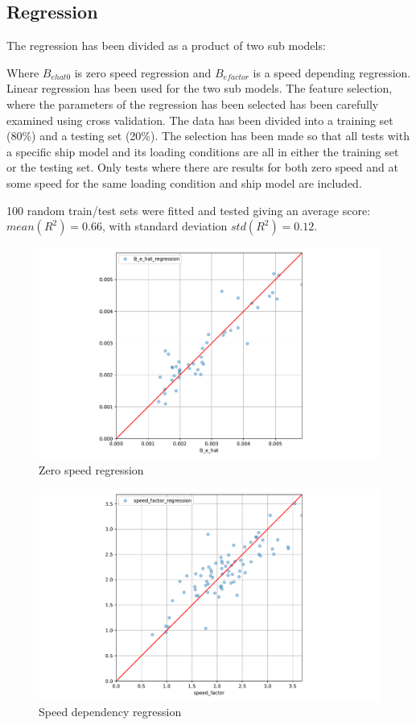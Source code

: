 \subsection{Regression}
The regression has been divided as a product of two sub models:

Where $B_{ehat0}$ is zero speed regression and $B_{efactor}$ is a speed depending regression. Linear regression has been used for the two sub models. The feature selection, where the parameters of the regression has been selected has been carefully examined using cross validation. The data has been divided into a  training set (80\%) and a testing set (20\%). The selection has been made so that all tests with a specific ship model and its loading conditions are all in either the training set or the testing set. Only tests where there are results for both zero speed and at some speed for the same loading condition and ship model are included.    

100 random train/test sets were fitted and tested giving an average score: $mean(R^2)=0.66$, with standard deviation $std(R^2)=0.12$.

\begin{figure}[H]
    \centering
    \includegraphics[width=\columnwidth]{figures/B_e_hat0_regression.pdf}
    \caption{Zero speed regression}
    \label{fig:B_e_hat0_regression}
\end{figure}

\begin{figure}[H]
    \centering
    \includegraphics[width=\columnwidth]{figures/B_e_factor_regression.pdf}
    \caption{Speed dependency regression}
    \label{fig:B_e_factor_regression}
\end{figure}

